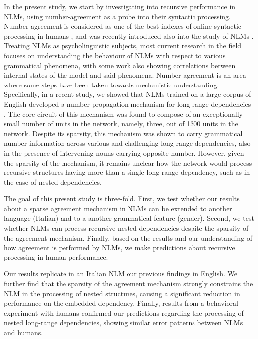 In the present study, we start by investigating into recursive performance in NLMs, using number-agreement as a probe into their syntactic processing. Number agreement is considered as one of the best indexes of online syntactic processing in humans \citep{Bock:Miller:1991, franck2002subject}, and was recently introduced also into the study of NLMs \citep{Linzen:etal:2016}. Treating NLMs as psycholinguistic subjects, most current research in the field focuses on understanding the behaviour of NLMs with respect to various grammatical phenomena, with some work also showing correlations between internal states of the model and said phenomena. Number agreement is an area where some steps have been taken towards mechanistic understanding. Specifically, in a recent study, we showed that NLMs trained on a large corpus of English developed a number-propagation mechanism for long-range dependencies \citep{lakretz2019emergence}. The core circuit of this mechanism was found to compose of an exceptionally small number of units in the network, namely, three, out of 1300 units in the network. Despite its sparsity, this mechanism was shown to carry grammatical number information across various and challenging long-range dependencies, also in the presence of intervening nouns carrying opposite number. However, given the sparsity of the mechanism, it remains unclear how the network would process recursive structures having more than a single long-range dependency, such as in the case of nested dependencies.

The goal of this present study is three-fold. First, we test whether our results about a sparse agreement mechanism in NLMs can be extended to another language (Italian) and to a another grammatical feature (gender). Second, we test whether NLMs can process recursive nested dependencies despite the sparsity of the agreement mechanism. Finally, based on the results and our understanding of how agreement is performed by NLMs, we make predictions about recursive processing in human performance. 

Our results replicate in an Italian NLM our previous findings in English. We further find that the sparsity of the agreement mechanism strongly constrains the NLM in the processing of nested structures, causing a significant reduction in performance on the embedded dependency. Finally, results from a behavioral experiment with humans confirmed our predictions regarding the processing of nested long-range dependencies, showing similar error patterns between NLMs and humans. 

